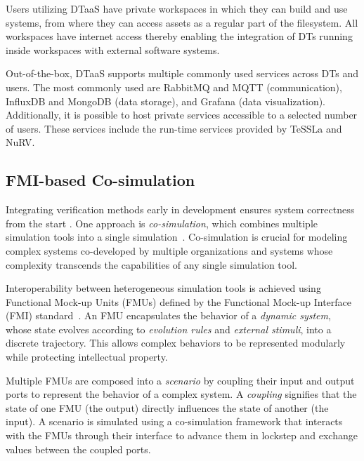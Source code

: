 Users utilizing DTaaS have private workspaces in which they can build and use systems, from where they can access assets as a regular part of the filesystem.
All workspaces have internet access thereby enabling the integration of DTs running inside workspaces with external software systems.

Out-of-the-box, DTaaS supports multiple commonly used services across DTs and users.
The most commonly used are RabbitMQ and MQTT (communication), InfluxDB and MongoDB (data storage), and Grafana (data visualization).
Additionally, it is possible to host private services accessible to a selected number of users.
These services include the run-time services provided by TeSSLa and NuRV.

\subsection{FMI-based Co-simulation}
\label{sc:fmi}
Integrating verification methods early in development ensures system correctness from the start \cite{Prasad&21a}.
One approach is \textit{co-simulation}, which combines multiple simulation tools into a single simulation~\cite{Gomes2018,Kubler2000}.
Co-simulation is crucial for modeling complex systems co-developed by multiple organizations and systems whose complexity transcends the capabilities of any single simulation tool.

Interoperability between heterogeneous simulation tools is achieved using Functional Mock-up Units (FMUs) defined by the Functional Mock-up Interface (FMI) standard~\cite{FMI2014}.
An FMU encapsulates the behavior of a \emph{dynamic system}, whose state evolves according to \emph{evolution rules} and \emph{external stimuli}, into a discrete trajectory.
This allows complex behaviors to be represented modularly while protecting intellectual property.

Multiple FMUs are composed into a \emph{scenario} by coupling their input and output ports to represent the behavior of a complex system.
A \emph{coupling} signifies that the state of one FMU (the output) directly influences the state of another (the input).
A scenario is simulated using a co-simulation framework that interacts with the FMUs through their interface to advance them in lockstep and exchange values between the coupled ports.
